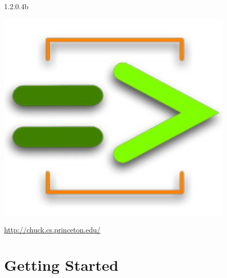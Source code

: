 \documentclass[11pt]{report}
\begin{document}
\thispagestyle{coverplain}
\vskip 6in
{\huge


}

\begin{center}
 1.2.0.4b
\end{center}
\vskip 1.5in
\begin{center}
  \includegraphics[height=4in]{images/chuck_logo2.jpg}

  \vskip 1in

  \Large{\href{http://chuck.cs.princeton.edu/}{http://chuck.cs.princeton.edu/}}
\end{center}

\newpage







\tableofcontents
\clearpage

\pagestyle{fancy}

\part*{Getting Started}
\end{document}
